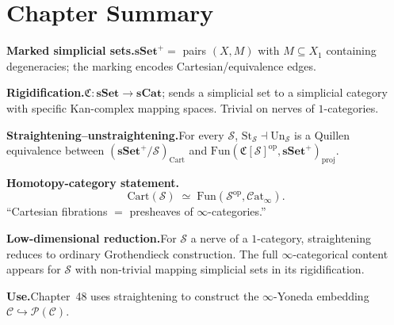 \begin{exercisesbox}
\begin{qa}
\end{qa}
\end{exercisesbox}


\section*{Chapter Summary}

\begin{summarybox}
\textbf{Marked simplicial sets.}\quad $\mathbf{sSet}^+ = $ pairs $(X, M)$
with $M \subseteq X_1$ containing degeneracies; the marking encodes
Cartesian/equivalence edges.

\textbf{Rigidification.}\quad $\mathfrak{C} : \mathbf{sSet} \to
\mathbf{sCat}$; sends a simplicial set to a simplicial category with
specific Kan-complex mapping spaces. Trivial on nerves of $1$-categories.

\textbf{Straightening--unstraightening.}\quad For every $\mathcal{S}$,
$\mathrm{St}_\mathcal{S} \dashv \mathrm{Un}_\mathcal{S}$ is a Quillen
equivalence between $(\mathbf{sSet}^+\!/\mathcal{S})_{\mathrm{Cart}}$
and $\mathrm{Fun}(\mathfrak{C}[\mathcal{S}]^{\mathrm{op}}, \mathbf{sSet}^+)_{\mathrm{proj}}$.

\textbf{Homotopy-category statement.}\quad
\begin{equation*}
  \mathrm{Cart}(\mathcal{S}) \;\simeq\; \mathrm{Fun}(\mathcal{S}^{\mathrm{op}}, \mathcal{C}\mathrm{at}_\infty).
\end{equation*}
``Cartesian fibrations $=$ presheaves of $\infty$-categories.''

\textbf{Low-dimensional reduction.}\quad For $\mathcal{S}$ a nerve of a
$1$-category, straightening reduces to ordinary Grothendieck construction.
The full $\infty$-categorical content appears for $\mathcal{S}$ with
non-trivial mapping simplicial sets in its rigidification.

\textbf{Use.}\quad Chapter~48 uses straightening to construct the
$\infty$-Yoneda embedding $\mathcal{C} \hookrightarrow \mathcal{P}(\mathcal{C})$.
\end{summarybox}



